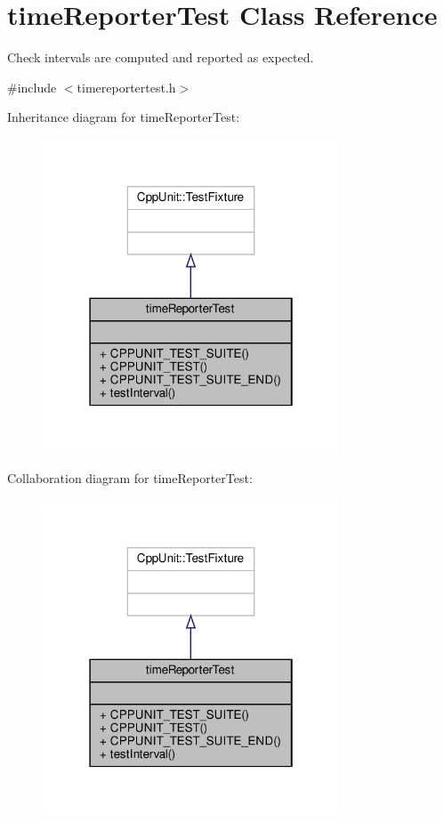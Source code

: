 \hypertarget{classtimeReporterTest}{}\section{time\+Reporter\+Test Class Reference}
\label{classtimeReporterTest}


Check intervals are computed and reported as expected.  




{\ttfamily \#include $<$timereportertest.\+h$>$}



Inheritance diagram for time\+Reporter\+Test\+:\nopagebreak
\begin{figure}[H]
\begin{center}
\leavevmode
\includegraphics[width=250pt]{classtimeReporterTest__inherit__graph}
\end{center}
\end{figure}


Collaboration diagram for time\+Reporter\+Test\+:\nopagebreak
\begin{figure}[H]
\begin{center}
\leavevmode
\includegraphics[width=250pt]{classtimeReporterTest__coll__graph}
\end{center}
\end{figure}
